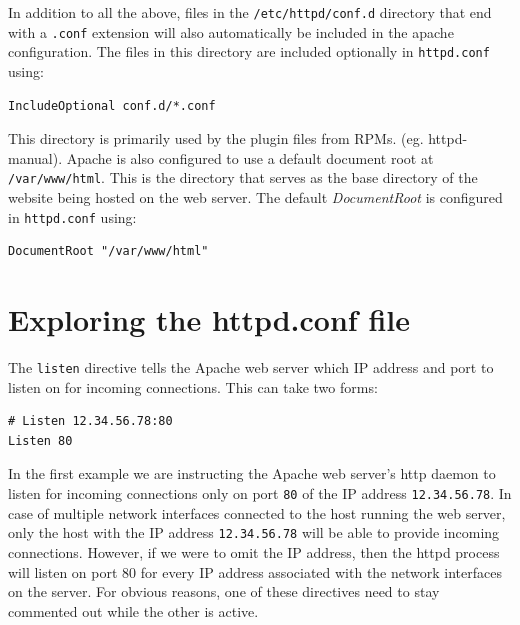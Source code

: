 \noindent
In addition to all the above, files in the \verb|/etc/httpd/conf.d| directory that end with a \verb|.conf| extension will also automatically be included in the apache configuration. The files in this directory are included optionally in \verb|httpd.conf| using:

\vspace{-15pt}
\begin{verbatim}
IncludeOptional conf.d/*.conf
\end{verbatim}
\vspace{-10pt}	

\noindent
This directory is primarily used by the plugin files from RPMs. (eg. httpd-manual). Apache is also configured to use a default document root at \verb|/var/www/html|. This is the directory that serves as the base directory of the website being hosted on the web server. The default \textit{DocumentRoot} is configured in \verb|httpd.conf| using:

\vspace{-15pt}
\begin{verbatim}
DocumentRoot "/var/www/html"
\end{verbatim}
\vspace{-10pt}	

\section{Exploring the httpd.conf file}
The \verb|listen| directive tells the Apache web server which IP address and port to listen on for incoming connections. This can take two forms:

\vspace{-15pt}
\begin{verbatim}
# Listen 12.34.56.78:80
Listen 80
\end{verbatim}
\vspace{-10pt}	

\noindent
In the first example we are instructing the Apache web server's http daemon to listen for incoming connections only on port \verb|80| of the IP address \verb|12.34.56.78|. In case of multiple network interfaces connected to the host running the web server, only the host with the IP address \verb|12.34.56.78| will be able to provide incoming connections. However, if we were to omit the IP address, then the httpd process will listen on port 80 for every IP address associated with the network interfaces on the server. For obvious reasons, one of these directives need to stay commented out while the other is active. 

